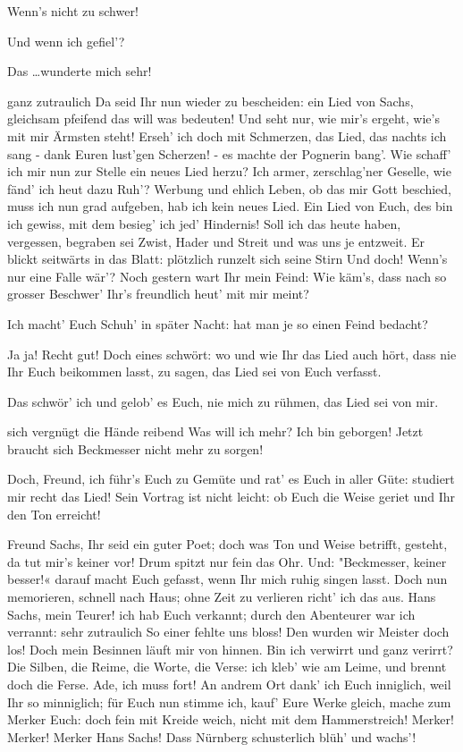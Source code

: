 \begin{drama}
\Sachsspeaks
Wenn's nicht zu schwer!

\Beckmesserspeaks
Und wenn ich gefiel'?

\Sachsspeaks
Das \ldots  wunderte mich sehr!

\Beckmesserspeaks
ganz zutraulich
Da seid Ihr nun wieder zu bescheiden:
ein Lied von Sachs,
gleichsam pfeifend
das will was bedeuten!
Und seht nur, wie mir's ergeht,
wie's mit mir Ärmsten steht!
Erseh' ich doch mit Schmerzen,
das Lied, das nachts ich sang -
dank Euren lust'gen Scherzen! -
es machte der Pognerin bang'.
Wie schaff' ich mir nun zur Stelle
ein neues Lied herzu?
Ich armer, zerschlag'ner Geselle,
wie fänd' ich heut dazu Ruh'?
Werbung und ehlich Leben,
ob das mir Gott beschied,
muss ich nun grad aufgeben,
hab ich kein neues Lied.
Ein Lied von Euch, des bin ich gewiss,
mit dem besieg' ich jed' Hindernis!
Soll ich das heute haben,
vergessen, begraben
sei Zwist, Hader und Streit
und was uns je entzweit.
Er blickt seitwärts in das Blatt: plötzlich runzelt sich seine Stirn
Und doch! Wenn's nur eine Falle wär'?
Noch gestern wart Ihr mein Feind:
Wie käm's, dass nach so grosser Beschwer'
Ihr's freundlich heut' mit mir meint?

\Sachsspeaks
Ich macht' Euch Schuh' in später Nacht:
hat man je so einen Feind bedacht?

\Beckmesserspeaks
Ja ja! Recht gut! Doch eines schwört:
wo und wie Ihr das Lied auch hört,
dass nie Ihr Euch beikommen lasst,
zu sagen, das Lied sei von Euch verfasst.

\Sachsspeaks
Das schwör' ich und gelob' es Euch,
nie mich zu rühmen, das Lied sei von mir.

\Beckmesserspeaks
sich vergnügt die Hände reibend
Was will ich mehr? Ich bin geborgen!
Jetzt braucht sich Beckmesser nicht mehr zu sorgen!

\Sachsspeaks
Doch, Freund, ich führ's Euch zu Gemüte
und rat' es Euch in aller Güte:
studiert mir recht das Lied!
Sein Vortrag ist nicht leicht:
ob Euch die Weise geriet
und Ihr den Ton erreicht!

\Beckmesserspeaks
Freund Sachs, Ihr seid ein guter Poet;
doch was Ton und Weise betrifft,
gesteht, da tut mir's keiner vor!
Drum spitzt nur fein das Ohr.
Und:
"Beckmesser, keiner besser!«
darauf macht Euch gefasst,
wenn Ihr mich ruhig singen lasst.
Doch nun memorieren,
schnell nach Haus;
ohne Zeit zu verlieren
richt' ich das aus.
Hans Sachs, mein Teurer!
ich hab Euch verkannt;
durch den Abenteurer
war ich verrannt:
sehr zutraulich
So einer fehlte uns bloss!
Den wurden wir Meister doch los!
Doch mein Besinnen
läuft mir von hinnen.
Bin ich verwirrt
und ganz verirrt?
Die Silben, die Reime,
die Worte, die Verse:
ich kleb' wie am Leime,
und brennt doch die Ferse.
Ade, ich muss fort!
An andrem Ort
dank' ich Euch inniglich,
weil Ihr so minniglich;
für Euch nun stimme ich,
kauf' Eure Werke gleich,
mache zum Merker Euch:
doch fein mit Kreide weich,
nicht mit dem Hammerstreich!
Merker! Merker! Merker Hans Sachs!
Dass Nürnberg schusterlich blüh' und wachs'!


\end{drama}
